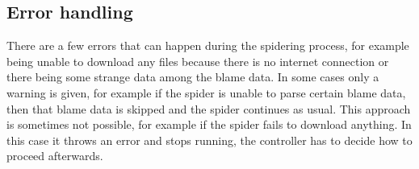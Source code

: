 \documentclass[../Main.tex]{subfiles}
\begin{document}
\subsection{Error handling}
There are a few errors that can happen during the spidering process, for example being unable to download any files because there is no internet connection or there being some strange data among the blame data. In some cases only a warning is given, for example if the spider is unable to parse certain blame data, then that blame data is skipped and the spider continues as usual. This approach is sometimes not possible, for example if the spider fails to download anything. In this case it throws an error and stops running, the controller has to decide how to proceed afterwards.
\end{document}

